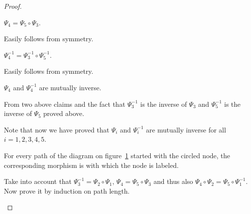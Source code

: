 \begin{proof}
\begin{claim}
$\Psi_4 = \Psi_5\circ\Psi_3$.
\end{claim}
\begin{claimproof}
Easily follows from symmetry.
\end{claimproof}

\begin{claim}
$\Psi_4^{-1} = \Psi_3^{-1}\circ\Psi_5^{-1}$.
\end{claim}
\begin{claimproof}
Easily follows from symmetry.
\end{claimproof}

\begin{claim}
$\Psi_4$ and $\Psi_4^{-1}$ are mutually inverse.
\end{claim}
\begin{claimproof}
From two above claims and the fact that
$\Psi_3^{-1}$ is the inverse of $\Psi_3$ and $\Psi_5^{-1}$ is the inverse of $\Psi_5$ proved above.
\end{claimproof}

Note that now we have proved that $\Psi_i$ and $\Psi_i^{-1}$ are mutually inverse for all $i=1,2,3,4,5$.

\begin{claim}
For every path of the diagram on figure~\ref{rels-dia2} started with the circled node, the corresponding morphism is with which the node is labeled.
\begin{figure}[ht]
\caption{\label{rels-dia2}}
\end{figure}
\end{claim}
\begin{claimproof}
Take into account that $\Psi_3^{-1} = \Psi_2\circ\Psi_1$, $\Psi_4 = \Psi_5\circ\Psi_3$
and thus also $\Psi_4\circ\Psi_2 = \Psi_5\circ\Psi_1^{-1}$.
Now prove it by induction on path length.
\end{claimproof}


\end{proof}
